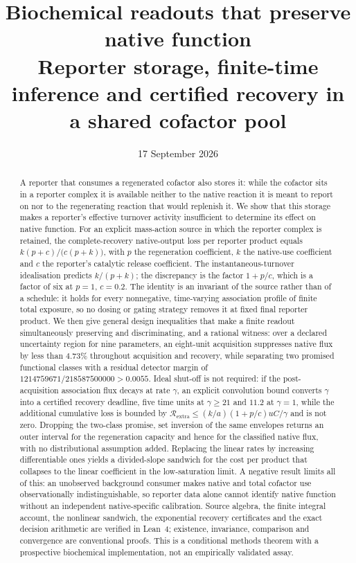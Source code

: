 \documentclass[11pt]{article}
\title{Biochemical readouts that preserve native function\\[4pt]
\large Reporter storage, finite-time inference and certified recovery
in a shared cofactor pool}
\author{\PaperAuthor}
\date{17 September 2026}
\theoremstyle{definition}
\theoremstyle{remark}
\newcommand{\Rem}{\mathcal{R}}
\begin{document}
\maketitle

\begin{abstract}
A reporter that consumes a regenerated cofactor also stores it: while the
cofactor sits in a reporter complex it is available neither to the native
reaction it is meant to report on nor to the regenerating reaction that would
replenish it. We show that this storage makes a reporter's effective turnover
activity insufficient to determine its effect on native function. For an
explicit mass-action source in which the reporter complex is retained, the
complete-recovery native-output loss per reporter product equals
$k(p+c)/\bigl(c(p+k)\bigr)$, with $p$ the regeneration coefficient, $k$ the
native-use coefficient and $c$ the reporter's catalytic release coefficient.
The instantaneous-turnover idealisation predicts $k/(p+k)$; the discrepancy is
the factor $1+p/c$, which is a factor of six at $p=1$, $c=0.2$. The identity is
an invariant of the source rather than of a schedule: it holds for every
nonnegative, time-varying association profile of finite total exposure, so no
dosing or gating strategy removes it at fixed final reporter product. We then
give general design inequalities that make a finite readout simultaneously
preserving and discriminating, and a rational witness: over a declared
uncertainty region for nine parameters, an eight-unit acquisition suppresses
native flux by less than $4.73\%$ throughout acquisition and recovery, while
separating two promised functional classes with a residual detector margin of
$1214759671/218587500000>0.0055$. Ideal shut-off is not required: if the
post-acquisition association flux decays at rate $\gamma$, an explicit
convolution bound converts $\gamma$ into a certified recovery deadline, five
time units at $\gamma\ge21$ and $11.2$ at $\gamma=1$, while the additional
cumulative loss is bounded by $\Rem_{\mathrm{extra}}\le
(k/a)(1+p/c)uC/\gamma$ and is not zero. Dropping the two-class promise, set
inversion of the same envelopes returns an outer interval for the regeneration
capacity and hence for the classified native flux, with no distributional
assumption added. Replacing the linear rates by increasing differentiable ones
yields a divided-slope sandwich for the cost per product that collapses to the
linear coefficient in the low-saturation limit. A negative result limits all of
this: an unobserved background consumer makes native and total cofactor use
observationally indistinguishable, so reporter data alone cannot identify
native function without an independent native-specific calibration. Source
algebra, the finite integral account, the nonlinear sandwich, the exponential
recovery certificates and the exact decision arithmetic are verified in
Lean~4; existence, invariance, comparison and convergence are conventional
proofs. This is a conditional methods theorem with a prospective biochemical
implementation, not an empirically validated assay.
\end{abstract}
\end{document}
